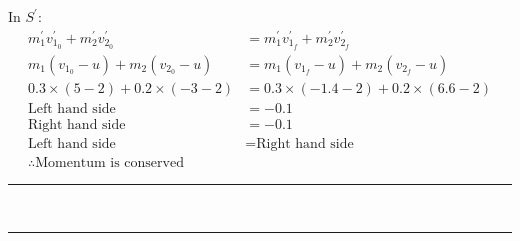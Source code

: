 \documentclass[a4paper,12pt]{article}
\begin{document}
In $S^\prime$:
\begin{align}
    m_1^\prime v_{1_0}^\prime + m_2^\prime v_{2_0}^\prime &= m_1^\prime v_{1_f}^\prime + m_2^\prime v_{2_f}^\prime \tag{to be proven} \\
    m_1 (v_{1_0} - u) + m_2 (v_{2_0} - u)  &= m_1 (v_{1_f} - u) + m_2 (v_{2_f} - u) \tag{1} \\
    0.3 \times (5-2) + 0.2 \times (-3 - 2) &= 0.3 \times (-1.4 - 2) + 0.2 \times (6.6 - 2) \tag{2} \\
    \text{Left hand side} &= -0.1 \tag{3} \\
    \text{Right hand side} &= -0.1 \tag{4} \\
    \text{Left hand side} &= \text{Right hand side} \tag{5} \\
    \therefore \text{Momentum is conserved} \tag{from (5)}
\end{align}

\begin{center}
    \rule{6cm}{0.8pt}\\
    \rule{4cm}{0.4pt}    
\end{center}
\end{document}
